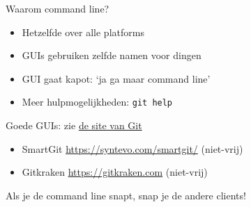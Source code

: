 \begin{frame}{Waarom command line?}
	\begin{itemize}
		\item Hetzelfde over alle platforms
		\item GUIs gebruiken zelfde namen voor dingen
		\item GUI gaat kapot: `ja ga maar command line'
		\item Meer hulpmogelijkheden: \texttt{git help}
	\end{itemize}
	Goede GUIs: zie \href{https://git-scm.com/downloads/guis}{de site van Git}
	\begin{itemize}
		\item SmartGit \url{https://syntevo.com/smartgit/} (niet-vrij)
		\item Gitkraken \url{https://gitkraken.com} (niet-vrij)
	\end{itemize}
	Als je de command line snapt, snap je de andere clients!
\end{frame}
